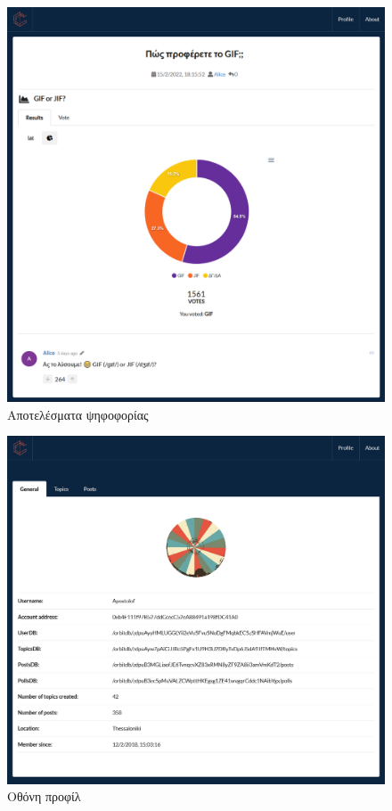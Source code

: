 \begin{figure}[H]
	\centering
	\includegraphics[width=\textwidth]{assets/figures/appendix-a/screenshot-8-poll-results}
	\caption{Αποτελέσματα ψηφοφορίας}
\end{figure}

\begin{figure}[H]
	\centering
	\includegraphics[width=\textwidth]{assets/figures/appendix-a/screenshot-9-profile-screen}
	\caption{Οθόνη προφίλ}
\end{figure}

